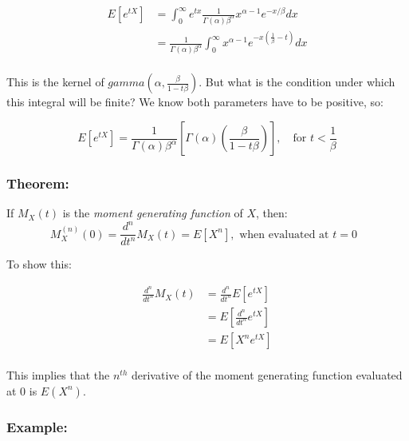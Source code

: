 \documentclass{article}
\begin{document}
\begin{equation*}
    \begin{split}
        E[e^{tX}] &= \int_0^\infty e^{tx} \frac{1}{\Gamma(\alpha) \beta^\alpha} x^{\alpha-1} e^{-x/\beta} dx\\
        &=\frac{1}{\Gamma(\alpha) \beta^\alpha} \int_0^\infty x^{\alpha-1} e^{-x(\frac{1}{\beta}-t)} dx\\
    \end{split}
\end{equation*}

This is the kernel of $gamma(\alpha, \frac{\beta}{1-t\beta})$. But what is the condition under which this integral will be finite? We know both parameters have to be positive, so:

\begin{equation*}
    E[e^{tX}] = \frac{1}{\Gamma(\alpha) \beta^\alpha} \left[\Gamma(\alpha) \left( \frac{\beta}{1-t\beta} \right)\right], \quad \text{for } t < \frac{1}{\beta}
\end{equation*}

\subsubsection*{Theorem:}

If $M_X(t)$ is the \textit{moment generating function} of $X$, then:
\begin{equation*}
    M_X^{(n)} (0) = \frac{d^n}{dt^n} M_X(t) = E[X^n], \text{ when evaluated at $t=0$ }
\end{equation*}

To show this:

\begin{equation*}
    \begin{split}
        \frac{d^n}{dt^n} M_X(t) &= \frac{d^n}{dt^n} E\left[e^{tX}\right]\\
                                &= E\left[ \frac{d^n}{dt^n} e^{tX}\right]\\
                                &= E\left[X^n e^{tX}\right]\\
    \end{split}
\end{equation*}

This implies that the $n^{th}$ derivative of the moment generating function evaluated at $0$ is $E(X^n)$.

\subsubsection*{Example:}
\end{document}
